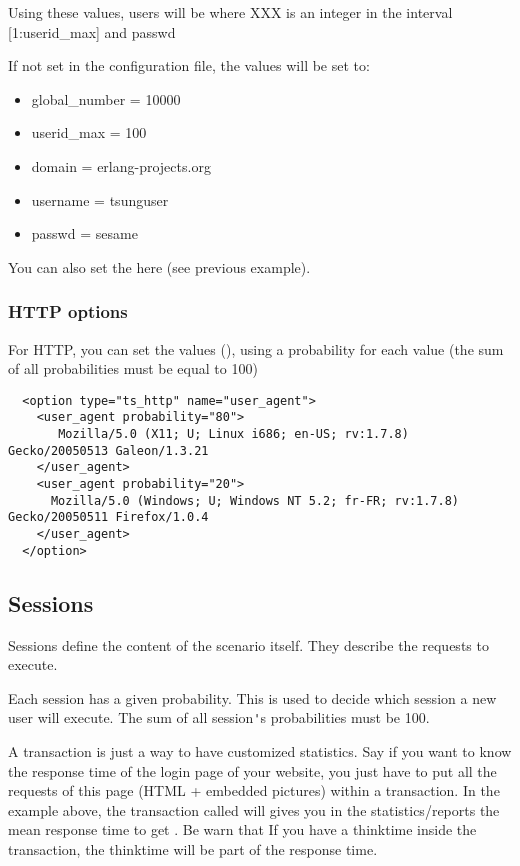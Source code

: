 \documentclass{TSUNG-en}
\begin{document}
Using these values, users will be  where XXX is an integer in
the interval [1:userid\_max] and passwd  

If not set in the configuration file, the values will be set to:
\begin{itemize}
\item global\_number = 10000
\item userid\_max    = 100
\item domain   = erlang-projects.org
\item username = tsunguser
\item passwd   = sesame
\end{itemize}

You can also set the  here (see previous example).

\subsubsection{HTTP options}

For HTTP, you can set the  values
(), using a probability for each
value (the sum of all probabilities must be equal to 100)

\begin{Verbatim}
  <option type="ts_http" name="user_agent">
    <user_agent probability="80">
       Mozilla/5.0 (X11; U; Linux i686; en-US; rv:1.7.8) Gecko/20050513 Galeon/1.3.21
    </user_agent>
    <user_agent probability="20">
      Mozilla/5.0 (Windows; U; Windows NT 5.2; fr-FR; rv:1.7.8) Gecko/20050511 Firefox/1.0.4
    </user_agent>
  </option>
\end{Verbatim}

\subsection{Sessions}
\label{sec:sessions}

Sessions define the content of the scenario itself. They describe
the requests to execute.


Each session has a given probability. This is used to decide which
session a new user will execute. The sum of all session\verb|'|s
probabilities must be 100.



A transaction is just a way to have customized statistics. Say if you
want to know the response time of the login page of your website, you
just have to put all the requests of this page (HTML + embedded
pictures) within a transaction. In the example above, the transaction
called  will gives you in the
statistics/reports the mean response time to get
. Be warn that If you have a
thinktime inside the transaction, the thinktime will be part of the
response time.
\end{document}
